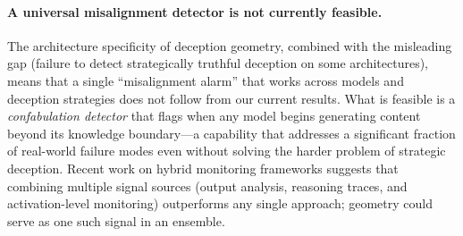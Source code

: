 \paragraph{A universal misalignment detector is not currently feasible.}
The architecture specificity of deception geometry, combined with the misleading gap (failure to detect strategically truthful deception on some architectures), means that a single ``misalignment alarm'' that works across models and deception strategies does not follow from our current results.
What is feasible is a \emph{confabulation detector} that flags when any model begins generating content beyond its knowledge boundary---a capability that addresses a significant fraction of real-world failure modes even without solving the harder problem of strategic deception.
Recent work on hybrid monitoring frameworks \cite{deceptguard2026} suggests that combining multiple signal sources (output analysis, reasoning traces, and activation-level monitoring) outperforms any single approach; \kvcache geometry could serve as one such signal in an ensemble.